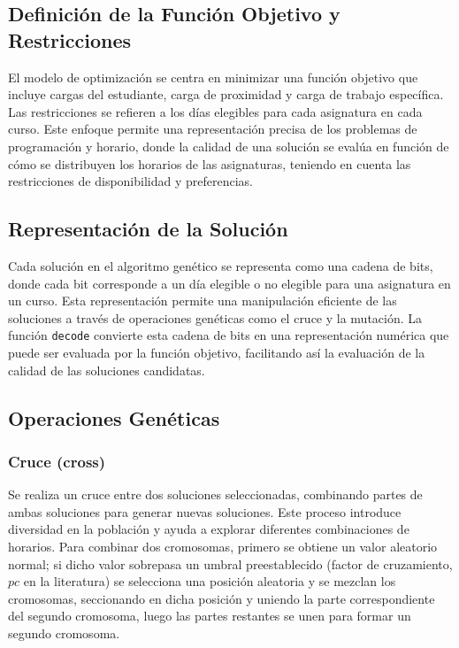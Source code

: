 \documentclass{article}
\begin{document}
\subsection{Definición de la Función Objetivo y Restricciones}

El modelo de optimización se centra en minimizar una función objetivo que incluye cargas del estudiante, carga de proximidad y carga de trabajo específica. Las restricciones se refieren a los días elegibles para cada asignatura en cada curso. Este enfoque permite una representación precisa de los problemas de programación y horario, donde la calidad de una solución se evalúa en función de cómo se distribuyen los horarios de las asignaturas, teniendo en cuenta las restricciones de disponibilidad y preferencias.

\subsection{Representación de la Solución}

Cada solución en el algoritmo genético se representa como una cadena de bits, donde cada bit corresponde a un día elegible o no elegible para una asignatura en un curso. Esta representación permite una manipulación eficiente de las soluciones a través de operaciones genéticas como el cruce y la mutación. La función \texttt{decode} convierte esta cadena de bits en una representación numérica que puede ser evaluada por la función objetivo, facilitando así la evaluación de la calidad de las soluciones candidatas.

\subsection{Operaciones Genéticas}

\subsubsection{Cruce (cross)}

Se realiza un cruce entre dos soluciones seleccionadas, combinando partes de ambas soluciones para generar nuevas soluciones. Este proceso introduce diversidad en la población y ayuda a explorar diferentes combinaciones de horarios.
Para combinar dos cromosomas, primero se obtiene un valor aleatorio normal; si dicho valor sobrepasa un umbral preestablecido (factor de cruzamiento, \(pc\) en la literatura) se selecciona una posici\'on aleatoria y se mezclan los cromosomas, seccionando en dicha posici\'on y uniendo la parte correspondiente del segundo cromosoma, luego las partes restantes se unen para formar un segundo cromosoma.
\end{document}
